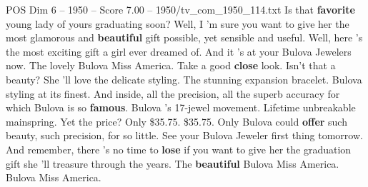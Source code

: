 \begin{textsample}{POS Dim 6 – 1950 – Score 7.00 – 1950/tv\_com\_1950\_114.txt}  \label{ex:f6_pos_001}
Is that \textbf{favorite} young lady of yours graduating soon?
Well, I 'm sure you want to give her the most glamorous and \textbf{beautiful} gift possible, yet sensible and useful.
Well, here 's the most exciting gift a girl ever dreamed of.
And it 's at your Bulova Jewelers now.
The lovely Bulova Miss America.
Take a good \textbf{close} look.
Isn't that a beauty?
She 'll love the delicate styling.
The stunning expansion bracelet.
Bulova styling at its finest.
And inside, all the precision, all the superb accuracy for which Bulova is so \textbf{famous}.
Bulova 's 17-jewel movement.
Lifetime unbreakable mainspring.
Yet the price?
Only \$35.75. \$35.75.
Only Bulova could \textbf{offer} such beauty, such precision, for so little.
See your Bulova Jeweler first thing tomorrow.
And remember, there 's no time to \textbf{lose} if you want to give her the graduation gift she 'll treasure through the years.
The \textbf{beautiful} Bulova Miss America.
Bulova Miss America.

\end{textsample}
